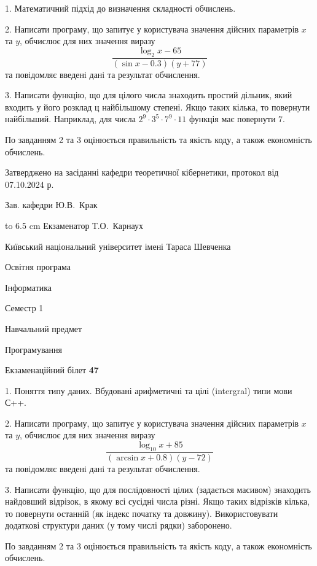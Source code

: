 \documentclass[12pt, ukrainian]{article}
\begin{document}
{%
1. Математичний підхід до визначення складності обчислень.%
\par
2. Написати програму, що запитує у користувача значення дійсних параметрів $x$ та $y$, обчислює для них значення виразу 
$$\frac{\log_{2} x - 65}{(\sin x - 0.3) (y + 77)}$$ 
та повiдомляє введенi данi та результат обчислення.

\par
3. Написати функцію, що для цілого числа знаходить простий дільник, який входить у його розклад ц найбільшому степені. Якщо таких кілька, то повернути найбільший. Наприклад, для числа $2^{9}{\cdot}3^5{\cdot}7^9{\cdot}11$ функція має повернути $7$.

По завданням 2 та 3 оцінюється правильність та якість коду, а також економність обчислень.

}
{\smallskip\smallskip \begin {scriptsize} Затверджено на засіданні кафедри теоретичної кібернетики, протокол   від   07.10.2024 р.\par\smallskip\smallskip\smallskip\smallskip
{\parbox {6.5 cm} {Зав. кафедри \dotfill Ю.В.~Крак}}\hspace {0.7cm} {\hbox to 6.5 cm { Екзаменатор \dotfill Т.О.~Карнаух}} \end{scriptsize}}
\vspace{0.9cm}
{{\begin {scriptsize}\par
{ \center  Київський національний університет імені Тараса Шевченка \par}
{\parbox {5 cm}{Освітня програма \hfill}{\parbox {7 cm}{Інформатика\hfill}}\parbox {6 cm}{\hfill Семестр 1}}\par
{\parbox {5 cm} {Навчальний предмет \hfill}\parbox {7 cm}{Програмування \hfill}\parbox {6cm}{\hfill}\par}\vspace{-15pt} \end{scriptsize}}{\center Екзаменаційний білет \No \textbf { 47 }\par}}
{%
1. Поняття типу даних. Вбудовані арифметичні та цілі (intergral) типи мови С++.%
\par
2. Написати програму, що запитує у користувача значення дійсних параметрів $x$ та $y$, обчислює для них значення виразу 
$$\frac{\log_{10} x + 85}{(\arcsin x + 0.8) (y - 72)}$$ 
та повiдомляє введенi данi та результат обчислення.

\par
3. Написати функцію, що для послідовності цілих (задається масивом) знаходить найдовший відрізок, в якому всі сусідні числа різні. Якщо таких відрізків кілька, то повернути останній (як індекс початку та довжину). Використовувати додаткові структури даних (у тому числі рядки) заборонено.

По завданням 2 та 3 оцінюється правильність та якість коду, а також економність обчислень.

}
\end{document}
